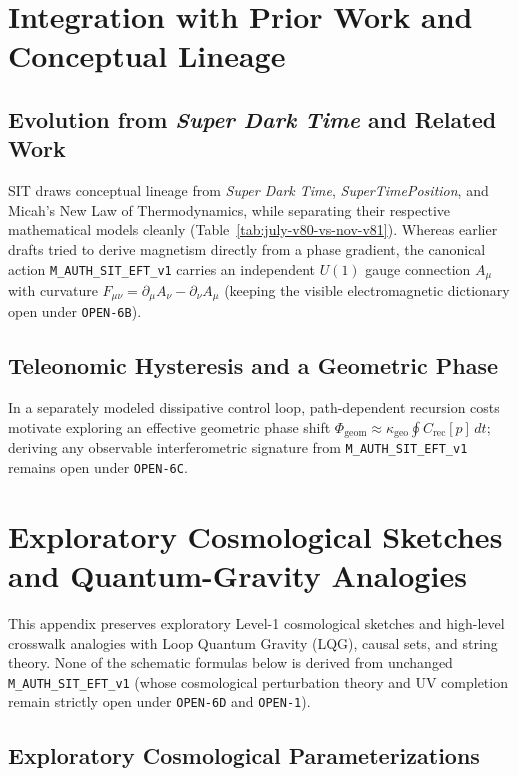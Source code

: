 \section{Integration with Prior Work and Conceptual Lineage}
\label{app:prior_work}

\subsection{Evolution from \emph{Super Dark Time} and Related Work}

SIT draws conceptual lineage from \emph{Super Dark Time}, \emph{SuperTimePosition}, and Micah's New Law of Thermodynamics, while separating their respective mathematical models cleanly (Table~\ref{tab:july-v80-vs-nov-v81}). Whereas earlier drafts tried to derive magnetism directly from a phase gradient, the canonical action \texttt{M\_AUTH\_SIT\_EFT\_v1} carries an independent $U(1)$ gauge connection $A_\mu$ with curvature $F_{\mu\nu} = \partial_\mu A_\nu - \partial_\nu A_\mu$ (keeping the visible electromagnetic dictionary open under \texttt{OPEN-6B}).


\subsection*{Teleonomic Hysteresis and a Geometric Phase}
\label{sec:geom-phase}
In a separately modeled dissipative control loop, path-dependent recursion costs motivate exploring an effective geometric phase shift $\Phi_{\mathrm{geom}} \approx \kappa_{\mathrm{geo}}\oint C_{\mathrm{rec}}[p]\,dt$; deriving any observable interferometric signature from \texttt{M\_AUTH\_SIT\_EFT\_v1} remains open under \texttt{OPEN-6C}.

\section{Exploratory Cosmological Sketches and Quantum-Gravity Analogies}
\label{appendix:D}

This appendix preserves exploratory Level-1 cosmological sketches and high-level crosswalk analogies with Loop Quantum Gravity (LQG), causal sets, and string theory. None of the schematic formulas below is derived from unchanged \texttt{M\_AUTH\_SIT\_EFT\_v1} (whose cosmological perturbation theory and UV completion remain strictly open under \texttt{OPEN-6D} and \texttt{OPEN-1}).

\subsection{Exploratory Cosmological Parameterizations}


